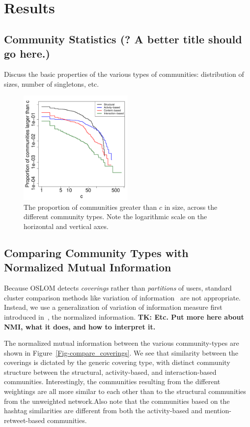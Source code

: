 \section{Results}

\subsection{Community Statistics (? A better title should go here.)}

Discuss the basic properties of the various types of communities: distribution of sizes, number of singletons, etc.

\begin{figure}[h!]
  \centering
\includegraphics[width=0.50\textwidth]{Figures/comm_sizes_ecdf_loglog.pdf}
\caption{The proportion of communities greater than $c$ in size, across the different community types. Note the logarithmic scale on the horizontal and vertical axes.}
\label{Fig-community_size_distribution}
\end{figure}

\subsection{Comparing Community Types with Normalized Mutual Information}

Because OSLOM detects \emph{coverings} rather than \emph{partitions} of users, standard cluster comparison methods like variation of information~\cite{meilua2003comparing} are not appropriate. Instead, we use a generalization of variation of information measure first introduced in~\cite{lancichinetti2009detecting}, the normalized information. \textbf{TK: Etc. Put more here about NMI, what it does, and how to interpret it.}

The normalized mutual information between the various community-types are shown in Figure~\ref{Fig-compare_coverings}. We see that similarity between the coverings is dictated by the generic covering type, with distinct community structure between the structural, activity-based, and interaction-based communities. Interestingly, the communities resulting from the different weightings are all more similar to each other than to the structural communities from the unweighted network.Also note that the communities based on the hashtag similarities are different from both the activity-based and mention-retweet-based communities.

